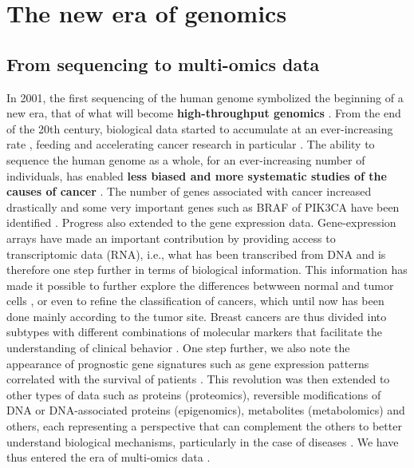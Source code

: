 \documentclass[a4paper,12pt,twoside,onecolumn,openright,final,oldfontcommands]{memoir}
\begin{document}
\section{The new era of genomics}\label{the-new-era-of-genomics}

\subsection{From sequencing to multi-omics
data}\label{from-sequencing-to-multi-omics-data}

In 2001, the first sequencing of the human genome symbolized the
beginning of a new era, that of what will become \textbf{high-throughput
genomics} \citep{lander2001initial, venter2001sequence}. From the end of
the 20th century, biological data started to accumulate at an
ever-increasing rate \citep{reuter2015high}, feeding and accelerating
cancer research in particular
\citep{stratton2009cancer, meyerson2010advances}. The ability to
sequence the human genome as a whole, for an ever-increasing number of
individuals, has enabled \textbf{less biased and more systematic studies
of the causes of cancer} \citep{lander2011initial}. The number of genes
associated with cancer increased drastically and some very important
genes such as BRAF of PIK3CA have been identified
\citep{davies2002mutations, samuels2004high}. Progress also extended to
the gene expression data. Gene-expression arrays have made an important
contribution by providing access to transcriptomic data (RNA), i.e.,
what has been transcribed from DNA and is therefore one step further in
terms of biological information. This information has made it possible
to further explore the differences betwween normal and tumor cells
\citep{perou1999distinctive}, or even to refine the classification of
cancers, which until now has been done mainly according to the tumor
site. Breast cancers are thus divided into subtypes with different
combinations of molecular markers that facilitate the understanding of
clinical behavior \citep{perou2000molecular}. One step further, we also
note the appearance of prognostic gene signatures such as gene
expression patterns correlated with the survival of patients
\citep{van2002gene}. This revolution was then extended to other types of
data such as proteins (proteomics), reversible modifications of DNA or
DNA-associated proteins (epigenomics), metabolites (metabolomics) and
others, each representing a perspective that can complement the others
to better understand biological mechanisms, particularly in the case of
diseases \citep{hasin2017multi}. We have thus entered the era of
multi-omics data \citep{vucic2012translating}.
\end{document}
